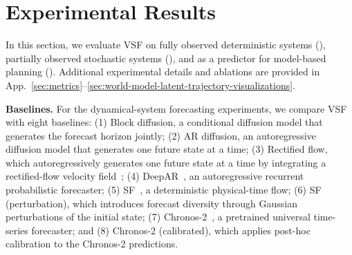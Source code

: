 \section{Experimental Results}
\label{sec:results}

In this section, we evaluate VSF on fully observed deterministic systems
(), partially observed stochastic systems
(), and as a predictor for model-based planning
(). Additional experimental details and ablations are
provided in App.~\ref{sec:metrics}--\ref{sec:world-model-latent-trajectory-visualizations}.


\textbf{Baselines.} For the dynamical-system forecasting experiments, we compare VSF with eight baselines: (1) Block diffusion, a conditional diffusion model that generates the forecast horizon jointly; (2) AR diffusion, an autoregressive diffusion model that generates one future state at a time; (3) Rectified flow, which autoregressively generates one future state at a time by integrating a rectified-flow velocity field~\citep{liu2022flow}; (4) DeepAR~\citep{salinas2020deepar}, an autoregressive recurrent probabilistic
forecaster; (5) SF~\citep{jiang2025streaming}, a deterministic
physical-time flow; (6) SF (perturbation), which introduces
forecast diversity through Gaussian perturbations of the initial state; (7)
Chronos-2~\citep{ansari2025chronos}, a pretrained universal time-series
forecaster; and (8) Chronos-2 (calibrated), which applies post-hoc calibration
to the Chronos-2 predictions.

